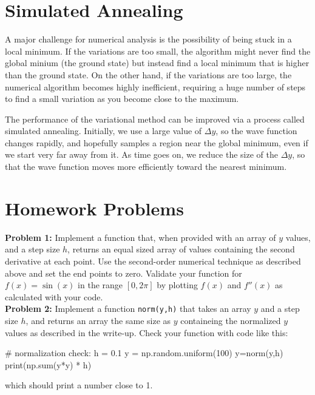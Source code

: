 \documentclass[12pt]{article}
\begin{document}
\section{Simulated Annealing}

A major challenge for numerical analysis is the possibility of being
stuck in a local minimum.  If the variations are too small, the
algorithm might never find the global minium (the ground state) but
instead find a local minimum that is higher than the ground state.  On
the other hand, if the variations are too large, the numerical
algorithm becomes highly inefficient, requiring a huge number of steps
to find a small variation as you become close to the maximum.

The performance of the variational method can be improved via a
process called simulated annealing.  Initially, we use a large value
of $\Delta y$, so the wave function changes rapidly, and hopefully
samples a region near the global minimum, even if we start very far
away from it.  As time goes on, we reduce the size of the $\Delta y$,
so that the wave function moves more efficiently toward the nearest
minimum.

\section{Homework Problems}

\noindent
{\bf Problem 1:} Implement a function that, when provided with an
array of $y$ values, and a step size $h$, returns an equal sized array
of values containing the second derivative at each point.  Use the
second-order numerical technique as described above and set the end
points to zero.  Validate your function for $f(x) = \sin(x)$ in the
range $[0,2\pi]$ by plotting $f(x)$ and $f''(x)$ as calculated with
your code.\\[5pt]

\noindent
{\bf Problem 2:} Implement a function {\tt norm(y,h)} that takes an
array $y$ and a step size $h$, and returns an array the same size as $y$ containeing the normalized $y$ values as described
in the write-up.  Check your function with code like this:
\begin{python}
# normalization check:
h = 0.1
y = np.random.uniform(100)
y=norm(y,h)
print(np.sum(y*y) * h)
\end{python}
which should print a number close to 1.\\[5pt]
\end{document}
